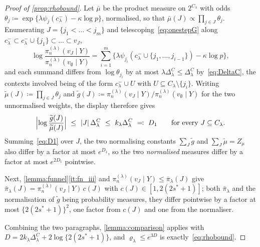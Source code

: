 \begin{proof}[Proof of \cref{prop:rhobound}]
    Let $\bar\mu$ be the product measure on $2^{C_\lambda}$ with odds
    $\theta_j\coloneq\exp\{\lambda\psi_j(c^{-}_\lambda)-\kappa\log p\}$,
    normalised, so that
    $\bar\mu(J)\propto\prod_{j\in J}\theta_j$. Enumerating
    $J=\{j_1<\dots<j_m\}$ and telescoping~\eqref{eq:onestepG} along
    $c^{-}_\lambda\subset c^{-}_\lambda\cup\{j_1\}\subset\dots\subset v_J$,
    \begin{equation*}
        \log\frac{\pi_n^{(\lambda)}(v_J\mid Y)}
        {\pi_n^{(\lambda)}(v_\emptyset\mid Y)}
        =\sum_{i=1}^{m}\bigl\{\lambda\psi_{j_i}
        (c^{-}_\lambda\cup\{j_1,\dots,j_{i-1}\})-\kappa\log p\bigr\},
    \end{equation*}
    and each summand differs from $\log\theta_{j_i}$ by at most
    $\lambda\Delta^{C}_\lambda\leq\Delta^{C}_\lambda$
    by~\eqref{eq:DeltaC}, the contexts involved being of the form
    $c^{-}_\lambda\cup U$ with $U\subseteq C_\lambda\setminus\{j_i\}$.
    Writing $\widetilde\mu(J)\coloneq\prod_{j\in J}\theta_j$ and
    $\widetilde g(J)\coloneq\pi_n^{(\lambda)}(v_J\mid Y)/
    \pi_n^{(\lambda)}(v_\emptyset\mid Y)$ for the two unnormalised
    weights, the display therefore gives
    \begin{equation}
        \label{eq:D1}
        \Bigl|\log\frac{\widetilde g(J)}{\widetilde\mu(J)}\Bigr|
        \ \leq\ \lvert J\rvert\,\Delta^{C}_\lambda
        \ \leq\ k_\lambda\Delta^{C}_\lambda
        \ \eqcolon\ D_1
        \qquad\text{for every }J\subseteq C_\lambda .
    \end{equation}
    Summing~\eqref{eq:D1} over $J$, the two normalising constants
    $\sum_J\widetilde g$ and $\sum_J\widetilde\mu=Z_\mu$ also differ by a
    factor at most $e^{D_1}$, so the two \emph{normalised} measures
    differ by a factor at most $e^{2D_1}$ pointwise.

    Next, \cref{lemma:funnel}\ref{it:fn_iii} and
    $\pi_n^{(\lambda)}(v_J\mid Y)\leq\bar\pi_\lambda(J)$ give
    $\bar\pi_\lambda(J)=\pi_n^{(\lambda)}(v_J\mid Y)\,c(J)$ with
    $c(J)\in[1,2(2s^{\ast}+1)]$; both $\bar\pi_\lambda$ and the
    normalisation of $\widetilde g$ being probability measures, they
    differ pointwise by a factor at most $\{2(2s^{\ast}+1)\}^{2}$, one
    factor from $c(J)$ and one from the normaliser.

    Combining the two paragraphs, \cref{lemma:comparison} applies with
    $D=2k_\lambda\Delta^{C}_\lambda+2\log\{2(2s^{\ast}+1)\}$, and
    $\varrho_\lambda\leq e^{3D}$ is exactly~\eqref{eq:rhobound}.
\end{proof}
